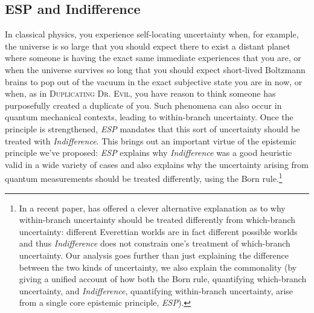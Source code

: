 \documentclass[onecolumn,secnumarabic,amsmath,amssymb,balancelastpage,nofootinbib]{article}
\begin{document}
\subsection{ESP and Indifference}\label{ESPIndifference}

In classical physics, you experience self-locating uncertainty when, for example, the universe is so large that you should expect there to exist a distant planet where someone is having the exact same immediate experiences that you are, or when the universe survives so long that you should expect short-lived Boltzmann brains to pop out of the vacuum in the exact subjective state you are in now, or when, as in \textsc{Duplicating Dr. Evil}, you have reason to think someone has purposefully created a duplicate of you.  Such phenomena can also occur in quantum mechanical contexts, leading to within-branch uncertainty.  Once the principle is strengthened, \emph{ESP} mandates that this sort of uncertainty should be treated with \emph{Indifference}.  This brings out an important virtue of the epistemic principle we've proposed: \emph{ESP} explains why \emph{Indifference} was a good heuristic valid in a wide variety of cases and also explains why the uncertainty arising from quantum measurements should be treated differently, using the Born rule.\footnote{{In a recent paper, \citep{wilson2015} has offered a clever alternative explanation as to why within-branch uncertainty should be treated differently from which-branch uncertainty: different Everettian worlds are in fact different possible worlds and thus \emph{Indifference} does not constrain one's treatment of which-branch uncertainty.  Our analysis goes further than just explaining the difference between the two kinds of uncertainty, we also explain the commonality (by giving a unified account of how both the Born rule, quantifying which-branch uncertainty, and \emph{Indifference}, quantifying within-branch uncertainty, arise from a single core epistemic principle, \emph{ESP}).\label{wilsonmove}}}
\end{document}
